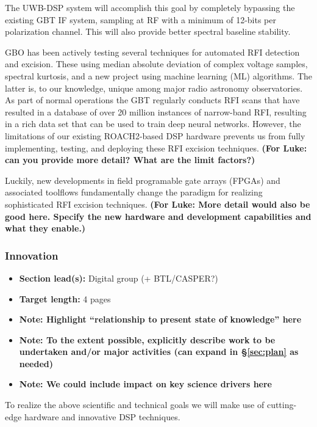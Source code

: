 \documentclass[10pt]{myNSF}
\begin{document}
The UWB-DSP system will accomplish this goal by completely bypassing
the existing GBT IF system, sampling at RF with a minimum of 12-bits
per polarization channel.  This will also provide better spectral
baseline stability.

 GBO has been actively testing several
techniques for automated RFI detection and excision.  These using
median absolute deviation of complex voltage samples, spectral
kurtosis, and a new project using machine learning (ML) algorithms.
The latter is, to our knowledge, unique among major radio astronomy
observatories.  As part of normal operations the GBT regularly
conducts RFI scans that have resulted in a database of over 20 million
instances of narrow-band RFI, resulting in a rich data set that can be
used to train deep neural networks.  However, the limitations of our
existing ROACH2-based DSP hardware prevents us from fully
implementing, testing, and deploying these RFI excision techniques.
\textbf{(For Luke: can you provide more detail?  What are the limit
  factors?)}

Luckily, new developments in field programable gate arrays (FPGAs) and
associated toolflows fundamentally change the paradigm for realizing
sophisticated RFI excision techniques.  \textbf{(For Luke: More detail
  would also be good here.  Specify the new hardware and development
  capabilities and what they enable.)}

\subsubsection{Innovation}
\label{sec:innovation}

\begin{itemize}
\item{\textbf{Section lead(s):} Digital group (+ BTL/CASPER?)}
\item{\textbf{Target length:} 4 pages}
\item{\textbf{Note: Highlight ``relationship to present state of
      knowledge'' here}}
\item{\textbf{Note: To the extent possible, explicitly describe work
      to be undertaken and/or major activities (can expand in
      \S\ref{sec:plan} as needed)}}
\item{\textbf{Note: We could include impact on key science drivers
      here}}
\end{itemize}

To realize the above scientific and technical goals we will make use
of cutting-edge hardware and innovative DSP techniques.
\end{document}
